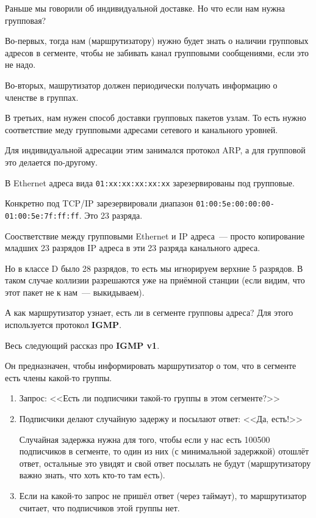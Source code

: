 
Раньше мы говорили об индивидуальной доставке. Но что если нам нужна групповая?

Во-первых, тогда нам (маршрутизатору) нужно будет знать о наличии групповых адресов в сегменте, чтобы не забивать канал групповыми сообщениями, если это не надо.

Во-вторых, машрутизатор должен периодически получать информацию о членстве в группах.

В третьих, нам нужен способ доставки групповых пакетов узлам. То есть нужно соответствие меду групповыми адресами сетевого и канального уровней.

Для индивидуальной адресации этим занимался протокол ARP, а для групповой это делается по-другому. 

В Ethernet адреса вида {\tt 01:xx:xx:xx:xx:xx} зарезервированы под групповые.

Конкретно под TCP/IP зарезервировали диапазон {\tt 01:00:5e:00:00:00-01:00:5e:7f:ff:ff}. Это 23 разряда.

Соостветствие между групповыми Ethernet и IP адреса~--- просто копирование младших 23 разрядов IP адреса в эти 23 разряда канального адреса.

Но в классе D было 28 разрядов, то есть мы игнорируем верхние 5 разрядов. В таком случае коллизии разрешаются уже на приёмной станции (если видим, что этот пакет не к нам~--- выкидываем).

А как маршрутизатор узнает, есть ли в сегменте групповы адреса? Для этого используется протокол {\bf IGMP}.

Весь следующий рассказ про {\bf IGMP v1}.

Он предназначен, чтобы информировать маршрутизатор о том, что в сегменте есть члены какой-то группы.

\begin{enumerate}
    \item Запрос: <<Есть ли подписчики такой-то группы в этом сегменте?>>
    \item Подписчики делают случайную задержу и посылают ответ: <<Да, есть!>>

    Случайная задержка нужна для того, чтобы если у нас есть 100500 подписчиков в сегменте, то один из них (с минимальной задержкой) отошлёт ответ, остальные это увидят и свой ответ посылать не будут (маршрутизатору важно знать, что хоть кто-то там есть).
    \item Если на какой-то запрос не пришёл ответ (через таймаут), то маршрутизатор считает, что подписчиков этой группы нет.
\end{enumerate}

